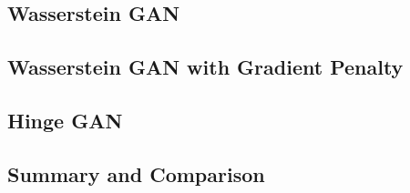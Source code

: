 \subsection{Wasserstein GAN}
\label{sec:wgan}

\subsection{Wasserstein GAN with Gradient Penalty}

\subsection{Hinge GAN}
\label{sec:hinge}

\subsection{Summary and Comparison}
\label{sec:loss_summary}


